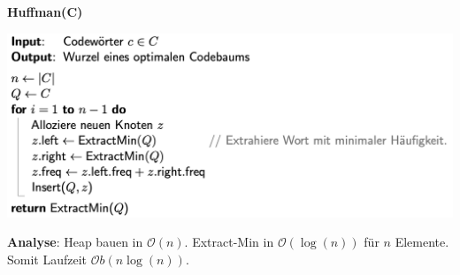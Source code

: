 \begin{sectionbox}
\textbf{Huffman(C)}
\begin{center}
    \includegraphics[width= \columnwidth]{img/HuffmanAlgo.png}
\end{center}\par\smallskip

\textbf{Analyse}: Heap bauen in $\mathcal{O}(n)$. Extract-Min in $\mathcal{O}(\log (n))$ für $n$ Elemente. Somit Laufzeit $\mathcal{O}b(n \log(n))$.
\end{sectionbox}

